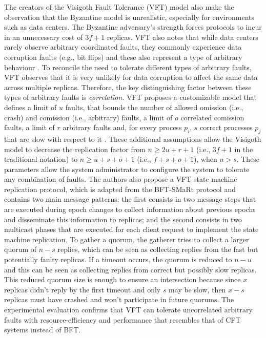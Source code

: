 The creators of the Visigoth Fault Tolerance (VFT) model also make the observation that the Byzantine model is unrealistic, especially for environments such as data centers. The Byzantine adversary's strength forces protocols to incur in an unnecessary cost of $3f+1$ replicas. VFT also notes that while data centers rarely observe arbitrary coordinated faults, they commonly experience data corruption faults (e.g., bit flips) and these also represent a type of arbitrary behaviour \cite{AmazonS31}\cite{AmazonS32}. To reconcile the need to tolerate different types of arbitrary faults, VFT observes that it is very unlikely for data corruption to affect the same data across multiple replicas. Therefore, the key distinguishing factor between these types of arbitrary faults is \textit{correlation}. VFT proposes a customizable model that defines a limit of $u$ faults, that bounds the number of allowed omission (i.e., crash) and comission (i.e., arbitrary) faults, a limit of $o$ correlated comission faults, a limit of $r$ arbitrary faults and, for every process $p_i$, $s$ correct processes $p_j$ that are slow with respect to it \cite{Porto2015}. These additional assumptions allow the Visigoth model to decrease the replication factor from $n \geq 2u+r+1$ (i.e., $3f+1$ in the traditional notation) to $n \geq u+s+o+1$ (i.e., $f+s+o+1$), when $u > s$. These parameters allow the system administrator to configure the system to tolerate any combination of faults. The authors also propose a VFT state machine replication protocol, which is adapted from the BFT-SMaRt protocol and contains two main message patterns: the first consists in two message steps that are executed during epoch changes to collect information about previous epochs and disseminate this information to replicas; and the second consists in two multicast phases that are executed for each client request to implement the state machine replication. To gather a quorum, the gatherer tries to collect a larger quorum of $n-s$ replies, which can be seen as collecting replies from the fast but potentially faulty replicas. If a timeout occurs, the quorum is reduced to $n-u$ and this can be seen as collecting replies from correct but possibly slow replicas. This reduced quorum size is enough to ensure an intersection because since $x$ replicas didn't reply by the first timeout and only $s$ may be slow, then $x-s$ replicas must have crashed and won't participate in future quorums. The experimental evaluation confirms that VFT can tolerate uncorrelated arbitrary faults with resource-efficiency and performance that resembles that of CFT systems instead of BFT. \par
